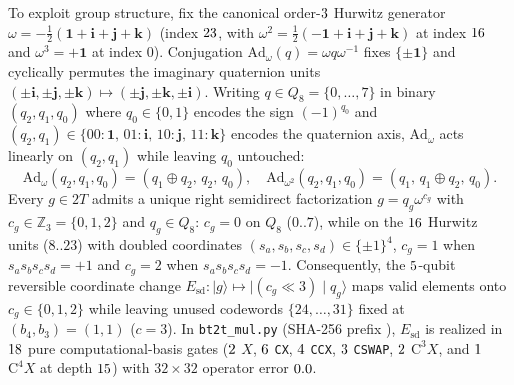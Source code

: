 \documentclass[aps,prx,twocolumn,superscriptaddress,nofootinbib]{revtex4-2}
\begin{document}
To exploit group structure, fix the canonical order-$3$ Hurwitz generator $\omega = -\tfrac{1}{2}(\mathbf{1} + \mathbf{i} + \mathbf{j} + \mathbf{k})$ (index $23$, with $\omega^2 = \tfrac{1}{2}(-\mathbf{1} + \mathbf{i} + \mathbf{j} + \mathbf{k})$ at index $16$ and $\omega^3 = +\mathbf{1}$ at index $0$). Conjugation $\mathrm{Ad}_\omega(q) = \omega q \omega^{-1}$ fixes $\{\pm\mathbf{1}\}$ and cyclically permutes the imaginary quaternion units $(\pm\mathbf{i}, \pm\mathbf{j}, \pm\mathbf{k}) \mapsto (\pm\mathbf{j}, \pm\mathbf{k}, \pm\mathbf{i})$. Writing $q \in Q_8 = \{0,\dots,7\}$ in binary $(q_2,q_1,q_0)$ where $q_0 \in \{0,1\}$ encodes the sign $(-1)^{q_0}$ and $(q_2,q_1) \in \{00:\mathbf{1},\,01:\mathbf{i},\,10:\mathbf{j},\,11:\mathbf{k}\}$ encodes the quaternion axis, $\mathrm{Ad}_\omega$ acts linearly on $(q_2,q_1)$ while leaving $q_0$ untouched:
\begin{equation}
  \mathrm{Ad}_\omega(q_2,q_1,q_0) = (q_1 \oplus q_2,\, q_2,\, q_0), \quad
  \mathrm{Ad}_{\omega^2}(q_2,q_1,q_0) = (q_1,\, q_1 \oplus q_2,\, q_0).
  \label{eq:ad_omega_linear}
\end{equation}
Every $g \in 2T$ admits a unique right semidirect factorization $g = q_g \omega^{c_g}$ with $c_g \in \mathbb{Z}_3 = \{0,1,2\}$ and $q_g \in Q_8$: $c_g = 0$ on $Q_8$ ($0..7$), while on the $16$ Hurwitz units ($8..23$) with doubled coordinates $(s_a,s_b,s_c,s_d) \in \{\pm 1\}^4$, $c_g = 1$ when $s_a s_b s_c s_d = +1$ and $c_g = 2$ when $s_a s_b s_c s_d = -1$. Consequently, the $5$-qubit reversible coordinate change $E_{\mathrm{sd}}:|g\rangle \mapsto |(c_g \ll 3) \mid q_g\rangle$ maps valid elements onto $c_g \in \{0,1,2\}$ while leaving unused codewords $\{24,\dots,31\}$ fixed at $(b_4,b_3) = (1,1)$ ($c = 3$). In \texttt{bt2t\_mul.py} (SHA-256 prefix \btmMulPySha), $E_{\mathrm{sd}}$ is realized in $18$ pure computational-basis gates ($2$ $X$, $6$ \texttt{CX}, $4$ \texttt{CCX}, $3$ \texttt{CSWAP}, $2$ $\mathrm{C}^3 X$, and $1$ $\mathrm{C}^4 X$ at depth $15$) with $32\times 32$ operator error $0.0$.
\end{document}
